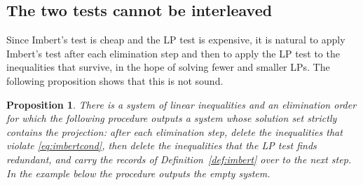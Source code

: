 \documentclass[11pt]{article}
\newtheorem{proposition}{Proposition}
\theoremstyle{definition}
\begin{document}
\subsection{The two tests cannot be interleaved}
\label{sec:incompat}

Since Imbert's test is cheap and the LP test is expensive, it is natural to apply Imbert's test after each elimination step and then to apply the LP test to the inequalities that survive, in the hope of solving fewer and smaller LPs. The following proposition shows that this is not sound.

\begin{proposition}
\label{prop:incompat}
There is a system of linear inequalities and an elimination order for which the following procedure outputs a system whose solution set strictly contains the projection: after each elimination step, delete the inequalities that violate \eqref{eq:imbertcond}, then delete the inequalities that the LP test finds redundant, and carry the records of Definition~\ref{def:imbert} over to the next step. In the example below the procedure outputs the empty system.
\end{proposition}
\end{document}
